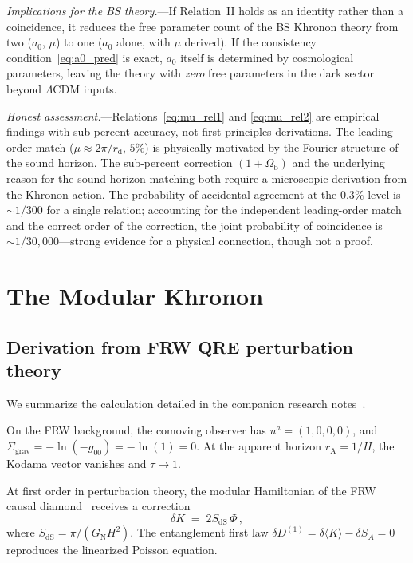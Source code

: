 \documentclass[prd,twocolumn,superscriptaddress,longbibliography,floatfix]{revtex4-2}
\newcommand{\tauasym}{\tau}
\newcommand{\GN}{G_{\mathrm{N}}}
\newcommand{\SdS}{S_{\mathrm{dS}}}
\newcommand{\rA}{r_{\mathrm{A}}}
\begin{document}
\emph{Implications for the BS theory.}---If
Relation~II holds as an identity rather than a
coincidence, it reduces the free parameter count
of the BS Khronon theory from two ($a_0$, $\mu$) to
one ($a_0$ alone, with $\mu$ derived).
If the consistency condition~\eqref{eq:a0_pred} is
exact, $a_0$ itself is determined by cosmological
parameters, leaving the theory with \emph{zero} free
parameters in the dark sector beyond $\Lambda$CDM
inputs.

\emph{Honest assessment.}---Relations~\eqref{eq:mu_rel1}
and \eqref{eq:mu_rel2} are empirical findings with
sub-percent accuracy, not first-principles derivations.
The leading-order match ($\mu \approx 2\pi/r_{\mathrm{d}}$,
$5\%$) is physically motivated by the Fourier structure
of the sound horizon.
The sub-percent correction $(1+\Omega_{\mathrm{b}})$
and the underlying reason for the sound-horizon matching
both require a microscopic derivation from the Khronon
action.
The probability of accidental agreement at the $0.3\%$
level is $\sim 1/300$ for a single relation; accounting
for the independent leading-order match and the correct
order of the correction, the joint probability of
coincidence is $\sim 1/30{,}000$---strong evidence for
a physical connection, though not a proof.


\section{The Modular Khronon}
\label{sec:khronon}

\subsection{Derivation from FRW QRE perturbation theory}

We summarize the calculation detailed in the companion
research notes~\cite{Paper4Notes}.

On the FRW background, the comoving observer has
$u^a = (1,0,0,0)$, and $\Sigma_{\mathrm{grav}} =
-\ln(-g_{00}) = -\ln(1) = 0$.  At the apparent horizon
$\rA = 1/H$, the Kodama vector vanishes and
$\tauasym \to 1$.

At first order in perturbation theory, the modular
Hamiltonian of the FRW causal diamond~\cite{AalsmaBak2025}
receives a correction
\begin{equation}
\delta K \;=\; 2\SdS\,\Phi\,,
\label{eq:delta_K}
\end{equation}
where $\SdS = \pi/(\GN H^2)$.  The entanglement first law
$\delta D^{(1)} = \delta\langle K\rangle - \delta S_A = 0$
reproduces the linearized Poisson equation.
\end{document}
